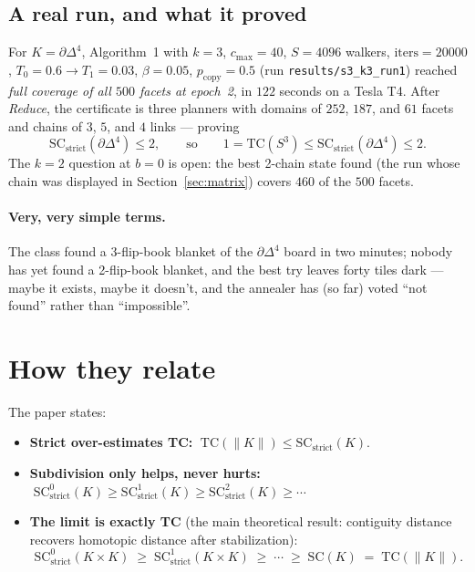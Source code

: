 \documentclass[11pt]{article}
\theoremstyle{definition}
\begin{document}
\subsection{A real run, and what it proved}

For $K = \partial\Delta^4$, Algorithm~1 with $k = 3$, $c_{\max} = 40$,
$S = 4096$ walkers, $\mathrm{iters} = 20000$, $T_0 = 0.6 \to T_1 = 0.03$,
$\beta = 0.05$, $p_{\mathrm{copy}} = 0.5$ (run \texttt{results/s3\_k3\_run1})
reached \emph{full coverage of all $500$ facets at epoch~2}, in $122$ seconds
on a Tesla T4. After \emph{Reduce}, the certificate is three planners with
domains of $252$, $187$, and $61$ facets and chains of $3$, $5$, and $4$
links --- proving
\[
\mathrm{SC}_{\mathrm{strict}}(\partial\Delta^4) \leq 2,
\qquad\text{so}\qquad
1 = \mathrm{TC}(S^3) \leq \mathrm{SC}_{\mathrm{strict}}(\partial\Delta^4) \leq 2.
\]
The $k = 2$ question at $b = 0$ is open: the best 2-chain state found (the
run whose chain was displayed in Section~\ref{sec:matrix}) covers $460$ of
the $500$ facets.

\paragraph{Very, very simple terms.}
The class found a 3-flip-book blanket of the $\partial\Delta^4$ board in two
minutes; nobody has yet found a 2-flip-book blanket, and the best try leaves
forty tiles dark --- maybe it exists, maybe it doesn't, and the annealer has
(so far) voted ``not found'' rather than ``impossible''.

\section{How they relate}


The paper states:

\begin{itemize}
  \item \textbf{Strict over-estimates TC:}
  $\;\mathrm{TC}(\lVert K\rVert) \leq \mathrm{SC}_{\mathrm{strict}}(K)$.
  \item \textbf{Subdivision only helps, never hurts:}
  $\;\mathrm{SC}_{\mathrm{strict}}^0(K) \geq \mathrm{SC}_{\mathrm{strict}}^1(K)
  \geq \mathrm{SC}_{\mathrm{strict}}^2(K) \geq \cdots$
  \item \textbf{The limit is exactly TC} (the main theoretical result:
  contiguity distance recovers homotopic distance after stabilization):
  \[
  \mathrm{SC}^0_{\mathrm{strict}}(K\times K) \;\geq\;
  \mathrm{SC}^1_{\mathrm{strict}}(K\times K) \;\geq\;
  \cdots \;\geq\;
  \mathrm{SC}(K) \;=\; \mathrm{TC}(\lVert K\rVert).
  \]
\end{itemize}
\end{document}
